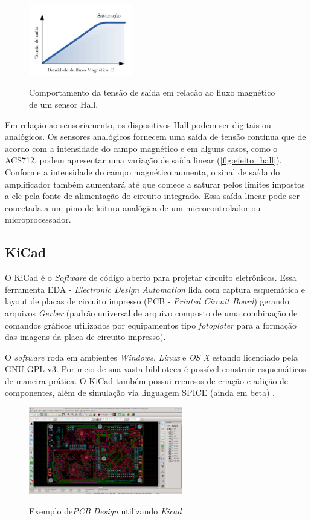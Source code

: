 \begin{figure}[H]
	\centering
	\caption{Comportamento da tensão de saída em relacão ao fluxo magnético de um sensor Hall.}
	\includegraphics[width=0.4\textwidth]{figuras/grafico_hall.jpg}
	\label{fig:efeito_hall}
\end{figure} 

Em relação ao sensoriamento, os dispositivos Hall podem ser digitais ou analógicos. Os sensores analógicos fornecem uma saída de tensão contínua que de acordo com a intensidade do campo magnético e em alguns casos, como o ACS712, podem apresentar uma variação de saída linear (\autoref{fig:efeito_hall}). Conforme a intensidade do campo magnético aumenta, o sinal de saída do amplificador também aumentará até que comece a saturar pelos limites impostos a ele pela fonte de alimentação do circuito integrado. Essa saída linear pode ser conectada a um pino de leitura analógica de um microcontrolador ou microprocessador.

\subsection{KiCad}

O KiCad é o \textit{Software} de código aberto para projetar circuito eletrônicos. Essa ferramenta EDA - \textit{Electronic Design Automation} lida com captura esquemática e layout de placas de circuito impresso (PCB - \textit{Printed Circuit Board}) gerando arquivos \textit{Gerber} (padrão universal de arquivo composto de uma combinação de comandos gráficos utilizados por equipamentos tipo \textit{fotoploter} para a formação das imagens da placa de circuito impresso).

O \textit{software} roda em ambientes \textit{Windows}, \textit{Linux} e \textit{OS X} estando licenciado pela GNU GPL v3. Por meio de sua vasta biblioteca é possível construir esquemáticos de maneira prática. O KiCad também possui recursos de criação e adição de componentes, além de simulação via linguagem SPICE (ainda em beta) \cite{Kicad}. 

\begin{figure}[H]
	\centering
	\caption{Exemplo de\textit{PCB Design} utilizando \textit{Kicad}}
	\includegraphics[width=0.6\textwidth]{figuras/kicad_pcbnew.png}
	\label{fig:kicad_pcbnew}
\end{figure} 


